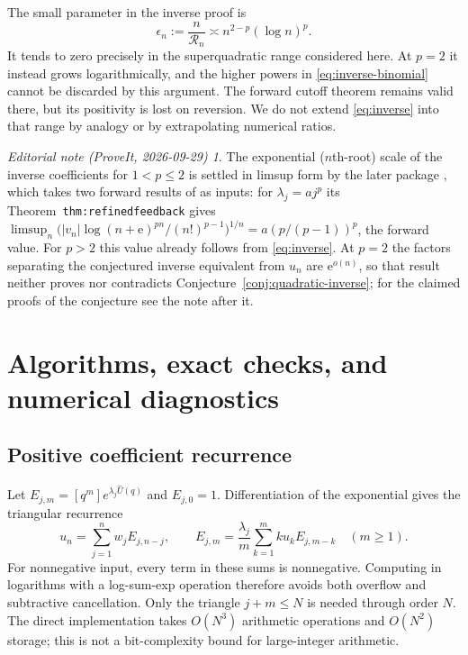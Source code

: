 \documentclass[11pt,a4paper]{article}
\numberwithin{equation}{section}
\theoremstyle{definition}
\theoremstyle{remark}
\newtheorem*{ednote}{Editorial note (ProveIt, 2026-09-29)}
\newcommand{\ee}{\mathrm e}\newcommand{\dd}{\mathrm d}
\newcommand{\Uhat}{\widehat U}\newcommand{\Vhat}{\widehat V}
\begin{document}
The small parameter in the inverse proof is
\[
 \epsilon_n:=\frac n{\mathcal R_n}
 \asymp n^{2-p}(\log n)^p.
\]
It tends to zero precisely in the superquadratic range considered here.
At $p=2$ it instead grows logarithmically, and the higher powers in
\eqref{eq:inverse-binomial} cannot be discarded by this argument.
The forward cutoff theorem remains valid there, but its positivity is
lost on reversion. We do not extend \eqref{eq:inverse} into that range by
analogy or by extrapolating numerical ratios.

\begin{ednote}
The exponential ($n$th-root) scale of the inverse coefficients for
$1<p\le2$ is settled in limsup form by the later package \cite{ed:swt},
which takes two forward results of \cite{feedback} as inputs: for
$\lambda_j=aj^p$ its Theorem~\texttt{thm:refinedfeedback} gives
$\limsup_n\bigl(|v_n|\log(n+\ee)^{pn}/(n!)^{p-1}\bigr)^{1/n}
=a(p/(p-1))^p$, the forward value. For $p>2$ this value already follows
from \eqref{eq:inverse}. At $p=2$ the factors separating the conjectured
inverse equivalent from $u_n$ are $\ee^{o(n)}$, so that result neither
proves nor contradicts Conjecture~\ref{conj:quadratic-inverse}; for the
claimed proofs of the conjecture see the note after it.
\end{ednote}

\section{Algorithms, exact checks, and numerical diagnostics}
\label{sec:computations}

\subsection{Positive coefficient recurrence}

Let $E_{j,m}=[q^m]e^{\lambda_j\Uhat(q)}$ and $E_{j,0}=1$.
Differentiation of the exponential gives the triangular recurrence
\begin{equation}
 u_n=\sum_{j=1}^n w_jE_{j,n-j},\qquad
 E_{j,m}=\frac{\lambda_j}{m}
              \sum_{k=1}^m k u_k E_{j,m-k}\quad(m\ge1).
 \label{eq:numeric-recurrence}
\end{equation}
For nonnegative input, every term in these sums is nonnegative. Computing
in logarithms with a log-sum-exp operation therefore avoids both overflow
and subtractive cancellation. Only the triangle $j+m\le N$ is needed
through order $N$. The direct implementation takes $O(N^3)$ arithmetic
operations and $O(N^2)$ storage; this is not a bit-complexity bound for
large-integer arithmetic.
\end{document}
